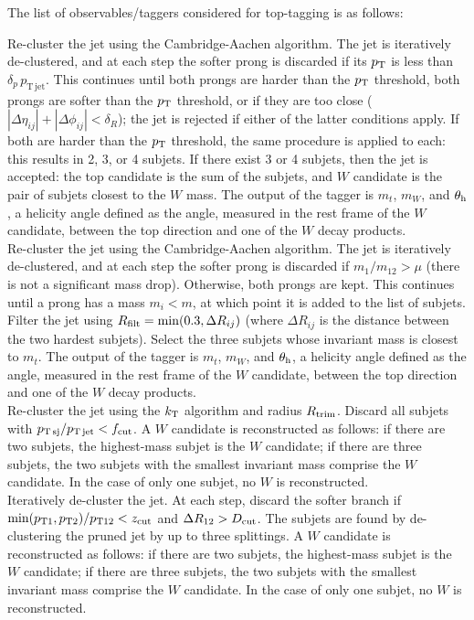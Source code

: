 The list of observables/taggers considered for top-tagging is as follows: 

 Re-cluster the jet using the Cambridge-Aachen algorithm. The jet is iteratively de-clustered, and at each step the softer prong is discarded if its $p_{\rm T}$ is less than $\delta_p\,p_{\mathrm{T\,jet}}$. This continues until both prongs are harder than the $p_{\rm T}$ threshold, both prongs are softer than the $p_{\rm T}$ threshold, or if they are too close ($|\Delta\eta_{ij}|+|\Delta\phi_{ij}|<\delta_R$); the jet is rejected if either of the latter conditions apply. If both are harder than the $p_{\rm T}$ threshold, the same procedure is applied to each: this results in 2, 3, or 4 subjets. If there exist 3 or 4 subjets, then the jet is accepted: the top candidate is the sum of the subjets, and $W$ candidate is the pair of subjets closest to the $W$ mass. The output of the tagger is $m_t$, $m_W$, and $\theta_{\rm h}$, a helicity angle defined as the angle, measured in the rest frame of the $W$ candidate, between the top direction and one of the $W$ decay products.\\

 Re-cluster the jet using the Cambridge-Aachen algorithm. The jet is iteratively de-clustered, and at each step the softer prong is discarded if $m_1/m_{12}>\mu$ (there is not a significant mass drop). Otherwise, both prongs are kept. This continues until a prong has a mass $m_i < m$, at which point it is added to the list of subjets. Filter the jet using $R_{\rm filt}=\mathrm{min}(0.3,\Delta R_{ij})$ (where $\Delta R_{ij}$ is the distance between the two hardest subjets). Select the three subjets whose invariant mass is closest to $m_t$. The output of the tagger is $m_t$, $m_W$, and $\theta_{\rm h}$, a helicity angle defined as the angle, measured in the rest frame of the $W$ candidate, between the top direction and one of the $W$ decay products.\\

 Re-cluster the jet using the $k_{\rm T}$ algorithm and radius $R_{\rm trim}$. Discard all subjets with $p_{\rm T\,sj}/p_{\rm T\,jet} < f_{\rm cut}$. A $W$ candidate is reconstructed as follows: if there are two subjets, the highest-mass subjet is the $W$ candidate; if there are three subjets, the two subjets with the smallest invariant mass comprise the $W$ candidate. In the case of only one subjet, no $W$ is reconstructed.\\

 Iteratively de-cluster the jet. At each step, discard the softer branch if $\mathrm{min}(p_{\rm T1},p_{\rm T2}) / p_{\rm T12} < z_{\rm cut}$ and $\Delta R_{12}>D_{\rm cut}$. The subjets are found by de-clustering the pruned jet by up to three splittings. A $W$ candidate is reconstructed as follows: if there are two subjets, the highest-mass subjet is the $W$ candidate; if there are three subjets, the two subjets with the smallest invariant mass comprise the $W$ candidate. In the case of only one subjet, no $W$ is reconstructed.
